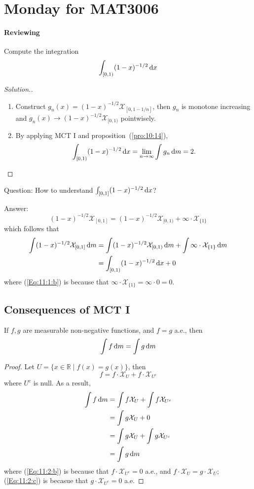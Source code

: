 
\section{Monday for MAT3006}

\paragraph{Reviewing}
Compute the integration
\[
\int_{[0,1)}(1-x)^{-1/2}\,\mathrm{d} x
\]
\begin{proof}[Solution.]
\begin{enumerate}
\item
Construct $g_n(x) = (1-x)^{-1/2}\mathcal{X}_{[0,1-1/n]}$, then $g_n$ is monotone increasing and $g_n(x)\to (1-x)^{-1/2}\mathcal{X}_{[0,1)}$ pointwisely.
\item
By applying MCT I and proposition~(\ref{pro:10:14}),
\[
\int_{[0,1)}(1-x)^{-1/2}\,\mathrm{d} x=\lim_{n\to\infty}\int g_n\,\mathrm{d} m
=
2.
\]
\end{enumerate}
\end{proof}
Question: How to understand $\int_{[0,1]}(1-x)^{-1/2}\,\mathrm{d} x$?

Answer: 
\[
(1-x)^{-1/2}\mathcal{X}_{[0,1]} = (1-x)^{-1/2}\mathcal{X}_{[0,1)} + \infty\cdot\mathcal{X}_{\{1\}}
\]
which follows that
\begin{subequations}
\begin{align}
\int (1-x)^{-1/2}\mathcal{X}_{[0,1]}\diff m&=\int (1-x)^{-1/2}\mathcal{X}_{[0,1)}\diff m+\int \infty\cdot\mathcal{X}_{\{1\}}\diff m\\
&=\int_{[0,1)}(1-x)^{-1/2}\diff x+0\label{Eq:11:1:b}
\end{align}
\end{subequations}
where (\ref{Eq:11:1:b}) is because that $\infty\cdot\mathcal{X}_{\{1\}}=\infty\cdot0=0$.
\subsection{Consequences of MCT I}

\begin{proposition}\label{pro:11:4}
If $f,g$ are measurable non-negative functions, and $f=g$ a.e., then
\[
\int f\,\mathrm{d} m=\int g\,\mathrm{d} m
\]
\end{proposition}
\begin{proof}
Let $U=\{x\in\mathbb{R}\mid f(x) = g(x)\}$, then
\[
f=f\cdot \mathcal{X}_{U}+f\cdot \mathcal{X}_{U^c}
\]
where $U^c$ is null. As a result,
\begin{subequations}
\begin{align}
\int f\diff m &= \int f \mathcal{X}_{U} + \int f\mathcal{X}_{U^c}\\&=\int g \mathcal{X}_{U}+0\label{Eq:11:2:b}\\
&=\int g\mathcal{X}_{U} + \int g\mathcal{X}_{U^c}\label{Eq:11:2:c} \\
&=\int g\diff m
\end{align}
\end{subequations}
where (\ref{Eq:11:2:b}) is because that  $f\cdot\mathcal{X}_{U^c}=0$ a.e., and $f\cdot\mathcal{X}_U=g\cdot\mathcal{X}_U$;
(\ref{Eq:11:2:c}) is becasue that $g\cdot\mathcal{X}_{U^c}=0$ a.e.
\end{proof}

